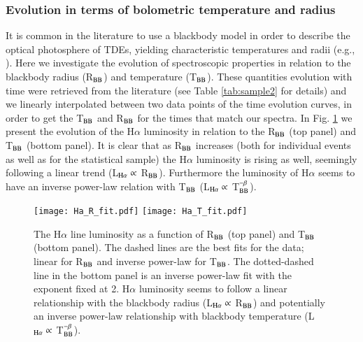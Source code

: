 \documentclass[structabstract]{aa}
\begin{document}
\subsubsection{Evolution in terms of bolometric temperature and radius} \label{subsub:eitobtar}

It is common in the literature to use a blackbody model in order to describe the optical photosphere of TDEs, yielding characteristic temperatures and radii (e.g., \citealt{vanvelzen2021,Hinkle2021a}). Here we investigate the evolution of spectroscopic properties in relation to the blackbody radius (R$_{\rm BB}$) and temperature (T$_{\rm BB}$). 
These quantities evolution with time were retrieved from the literature (see Table \ref{tab:sample2} for details) and we linearly interpolated between two data points of the time evolution curves, in order to get the T$_{\rm BB}$ and R$_{\rm BB}$ for the times that match our spectra. In Fig. \ref{fig:Ha_T_R} we present the evolution of the H$\alpha$ luminosity in relation to the R$_{\rm BB}$ (top panel) and T$_{\rm BB}$ (bottom panel). It is clear that as R$_{\rm BB}$ increases (both for individual events as well as for the statistical sample) the H$\alpha$ luminosity is rising as well, seemingly following a linear trend (L$_{\rm H\alpha} \propto$ R$_{\rm BB}$). Furthermore the luminosity of H$\alpha$ seems to have an inverse power-law relation with T$_{\rm BB}$ (L$_{\rm H\alpha} \propto$ T$_{\rm BB}^{-\beta}$). 



\begin{figure}
\centering
\texttt{[image: Ha\_R\_fit.pdf]}
\texttt{[image: Ha\_T\_fit.pdf]}
\caption{The H$\alpha$ line luminosity as a function of R$_{\rm BB}$ (top panel) and T$_{\rm BB}$ (bottom panel). The dashed lines are the best fits for the data; linear for R$_{\rm BB}$ and inverse power-law for T$_{\rm BB}$. The dotted-dashed line in the bottom panel is an inverse power-law fit with the exponent fixed at 2. H$\alpha$ luminosity seems to follow a linear relationship with the blackbody radius (L$_{\rm H\alpha} \propto$ R$_{\rm BB}$) and potentially an inverse power-law relationship with blackbody temperature (L$_{\rm H\alpha} \propto$ T$_{\rm BB}^{-\beta}$).}
\label{fig:Ha_T_R}
\end{figure}
\end{document}
